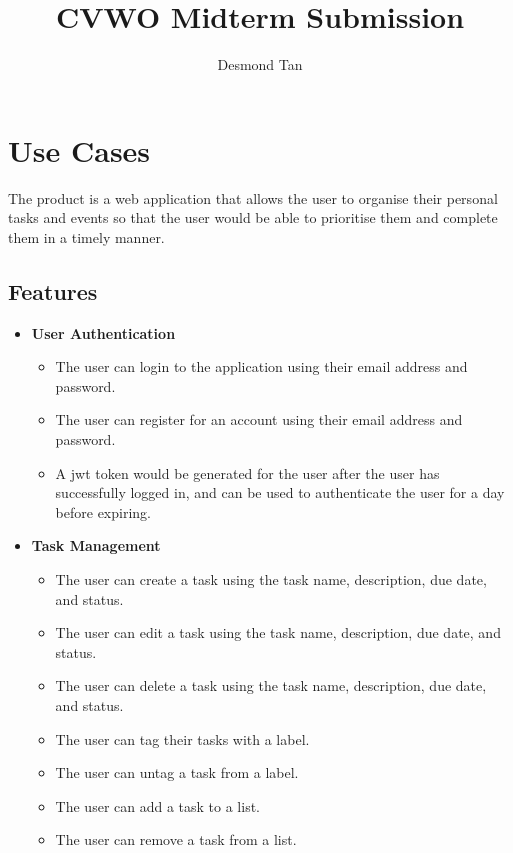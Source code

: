 \documentclass[10pt, a4paper]{article}
\title{CVWO Midterm Submission}
\author{Desmond Tan}
\begin{document}
  \maketitle
    \section{Use Cases}
      The product is a web application that allows the user to organise their personal tasks and events so that the user would be able to prioritise them and complete them in a timely manner.
      \subsection{Features}
        \begin{itemize}
          \item
            \textbf{User Authentication}
            \begin{itemize}
              \item
                The user can login to the application using their email address and password.
              \item
                The user can register for an account using their email address and password.
              \item
                A jwt token would be generated for the user after the user has successfully logged in, and can be used to authenticate the user for a day before expiring.
            \end{itemize}
          \item
            \textbf{Task Management}
            \begin{itemize}
              \item
                The user can create a task using the task name, description, due date, and status.
              \item
                The user can edit a task using the task name, description, due date, and status.
              \item
                The user can delete a task using the task name, description, due date, and status.
              \item The user can tag their tasks with a label.
              \item The user can untag a task from a label.
              \item The user can add a task to a list.
              \item The user can remove a task from a list.

\end{itemize}
\end{itemize}
\end{document}
